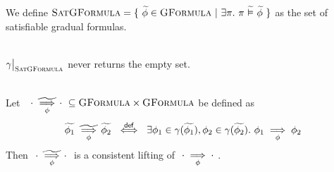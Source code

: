 We define $\textsc{SatGFormula} = \{~ \widetilde{\phi} \in \textsc{GFormula} ~|~ \exists \pi.~ \pi \,\,\widetilde{\vDash}\,\, \widetilde{\phi} ~\}$ as the set of satisfiable gradual formulas.

\begin{lemma}~\\
    $\restr{\gamma}{\setGFormulaA}$ never returns the empty set.
\end{lemma}

\begin{lemma}~\\
    Let $~~{\cdot} \,\,\underset{\phi}{\widetilde{\implies}}\, {\cdot}~ \subseteq \textsc{GFormula} \times \textsc{GFormula}$ be defined as
    \begin{displaymath} 
    {\widetilde{\phi_1}} \,\,\underset{\phi}{\widetilde{\implies}}\, {\widetilde{\phi_2}} ~\overset{\textup{\textsf{def}}}{\iff}~ \exists \phi_1 \in \gamma(\widetilde{\phi_1}), \phi_2 \in \gamma(\widetilde{\phi_2}).~ {\phi_1} \underset{\phi}{\implies} {\phi_2}
    \end{displaymath}
    Then $~{\cdot} \,\,\underset{\phi}{\widetilde{\implies}}\, {\cdot}~$ is a consistent lifting of $~{\cdot} \underset{\phi}{\implies} {\cdot}~$.
\end{lemma}


